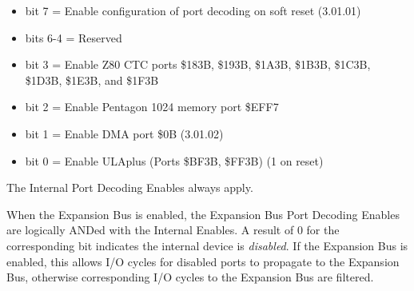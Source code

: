 \begin{itemize}
\item bit 7 = Enable configuration of port decoding on soft reset (3.01.01)
\item bits 6-4 = Reserved
\item bit 3 = Enable Z80 CTC ports \$183B, \$193B, \$1A3B, \$1B3B, \$1C3B,
  \$1D3B, \$1E3B, and \$1F3B
\item bit 2 = Enable Pentagon 1024 memory port \$EFF7
\item bit 1 = Enable DMA port \$0B (3.01.02)
\item bit 0 = Enable ULAplus (Ports \$BF3B, \$FF3B) (1 on reset)
\end{itemize}

The Internal Port Decoding Enables always apply.

When the Expansion Bus is enabled, the Expansion Bus Port Decoding
Enables are logically ANDed with the Internal Enables. A result of 0
for the corresponding bit indicates the internal device is
\emph{disabled}. If the Expansion Bus is enabled, this allows
I/O cycles for disabled ports to propagate to the Expansion Bus,
otherwise corresponding I/O cycles to the Expansion Bus are filtered.

